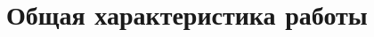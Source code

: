 \documentclass[a4paper,14pt]{extarticle}
\begin{document}
    \section{Общая характеристика работы}
\end{document}
